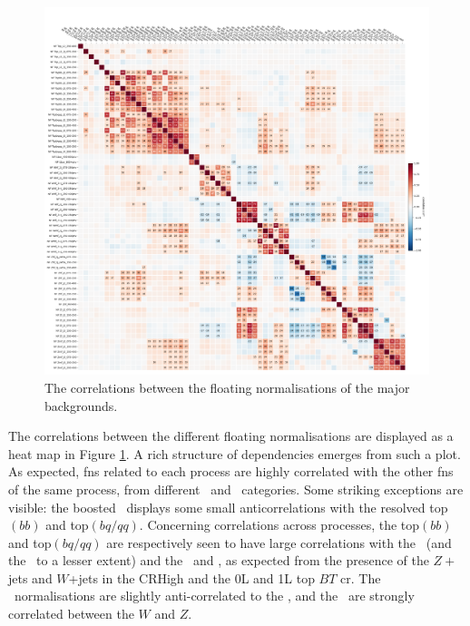 \begin{figure}[h!]
    \hspace{-1.5cm}
    \includegraphics[width=1.15\textwidth]{Images/VH/Fit/fromSlides/SMVHbbcc_2022_MVA_mc16ade_v14.fit_012_fullRes_VHbb_fit_012_012_mc16ade_Systs_mva_VHbbcc_AsimovFit_conditional_mu1_Cov_BTag}
    \caption{The correlations between the floating normalisations of the major backgrounds.}
    \label{fig:FNcorr}
\end{figure} 
\newpage

The correlations between the different floating normalisations are displayed as a heat map in Figure \ref{fig:FNcorr}. A rich structure of dependencies emerges from such a plot. As expected, \glspl{fn} related to each process are highly correlated with the other \glspl{fn} of the same process, from different \ptv\ and \nj\ categories. Some striking exceptions are visible: the boosted \ttb\ displays some small anticorrelations with the resolved top$(bb)$ and top$(bq/qq)$. Concerning correlations across processes, the top$(bb)$ and top$(bq/qq)$ are respectively seen to have large correlations with the \zhf\ (and the \whf\ to a lesser extent) and the \wmf\ and \zmf, as expected from the presence of the $Z+$jets and $W$+jets in the CRHigh and the 0L and 1L top $BT$ \gls{cr}. The \vhf\ normalisations are slightly anti-correlated to the \vlf, and the \vlf\ are strongly correlated between the $W$ and $Z$.

